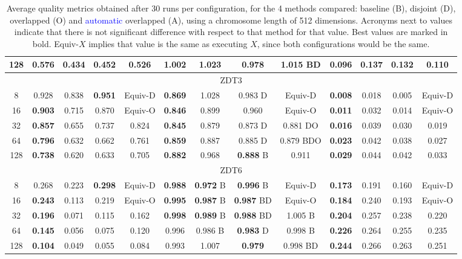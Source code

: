 \documentclass[preprint]{elsarticle}
\begin{document}
\begin{table}
{\begin{tabular}{|c||c|c|c|c||c|c|c|c||c|c|c|c||}
128	& \textbf{	0.576	}	&	0.434		&	0.452			&	0.526			&	1.002		&	1.023			& \textbf{	0.978	}		&	1.015	BD		& \textbf{	0.096	}	&	0.137		&	0.132		&	0.110					\\ \hline
\multicolumn{13}{|c|}{ZDT3}																																													\\ \hline
8	&	0.928		&	0.838		& \textbf{	0.951	}		&	Equiv-D			& \textbf{	0.869	}	&	1.028			&	0.983		D	&	Equiv-D			& \textbf{	0.008	}	&	0.018		&	0.005		&	Equiv-D					\\
16	& \textbf{	0.903	}	&	0.715		&	0.870			&	Equiv-O			& \textbf{	0.846	}	&	0.899			&	0.960			&	Equiv-O			& \textbf{	0.011	}	&	0.032		&	0.014		&	Equiv-O					\\
32	& \textbf{	0.857	}	&	0.655		&	0.737			&	0.824			& \textbf{	0.845	}	&	0.879			&	0.873		D	&	0.881	DO		& \textbf{	0.016	}	&	0.039		&	0.030		&	0.019					\\
64	& \textbf{	0.796	}	&	0.632		&	0.662			&	0.761			& \textbf{	0.859	}	&	0.887			&	0.885		D	&	0.879	BDO		& \textbf{	0.023	}	&	0.042		&	0.038		&	0.027					\\
128	& \textbf{	0.738	}	&	0.620		&	0.633			&	0.705			& \textbf{	0.882	}	&	0.968			& \textbf{	0.888	}	B	&	0.911			& \textbf{	0.029	}	&	0.044		&	0.042		&	0.033					\\ \hline
\multicolumn{13}{|c|}{ZDT6}																																													\\ \hline
8	&	0.268		&	0.223		& \textbf{	0.298	}		&	Equiv-D			& \textbf{	0.988	}	& \textbf{	0.972	}	B	& \textbf{	0.996	}	B	&	Equiv-D			& \textbf{	0.173	}	&	0.191		&	0.160		&	Equiv-D					\\
16	& \textbf{	0.243	}	&	0.113		&	0.219			&	Equiv-O			& \textbf{	0.995	}	& \textbf{	0.987	}	B	& \textbf{	0.987	}	BD	&	Equiv-O			& \textbf{	0.184	}	&	0.240		&	0.193		&	Equiv-O					\\
32	& \textbf{	0.196	}	&	0.071		&	0.115			&	0.162			& \textbf{	0.998	}	& \textbf{	0.989	}	B	& \textbf{	0.988	}	BD	&	1.005	B		& \textbf{	0.204	}	&	0.257		&	0.238		&	0.220					\\
64	& \textbf{	0.145	}	&	0.056		&	0.075			&	0.120			&	0.996		&	0.986		B	& \textbf{	0.983	}	D	&	0.998	B		& \textbf{	0.226	}	&	0.264		&	0.255		&	0.235					\\
128	& \textbf{	0.104	}	&	0.049		&	0.055			&	0.084			&	0.993		&	1.007			& \textbf{	0.979	}		&	0.998	BD		& \textbf{	0.244	}	&	0.266		&	0.263		&	0.251					\\ \hline

\end{tabular}
}
\caption{Average quality metrics obtained after 30 runs per configuration, for the 4 methods compared: baseline (B), disjoint (D), overlapped (O) and \textcolor{blue}{automatic} overlapped (A), using a chromosome length of 512 dimensions. Acronyms next to values indicate that there is not significant difference with respect to that method for that value. Best values are marked in bold. Equiv-$X$ implies that value is the same as executing $X$, since both configurations would be the same.}
\label{tab:results512}
\end{table}
\end{document}
